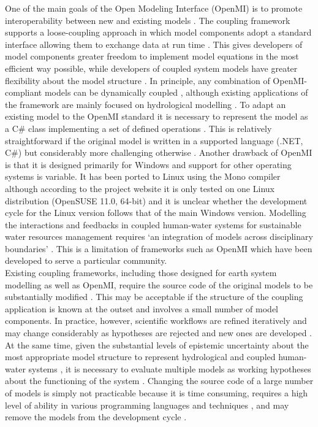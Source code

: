 \documentclass{icldt}\usepackage[]{graphicx}\usepackage[]{color}
\begin{document}
One of the main goals of the Open Modeling Interface (OpenMI) is to promote interoperability between new and existing models \citep{moore2005,gregerson2007,goodall2011}. The coupling framework supports a loose-coupling approach in which model components adopt a standard interface allowing them to exchange data at run time \citep{moore2005}. This gives developers of model components greater freedom to implement model equations in the most efficient way possible, while developers of coupled system models have greater flexibility about the model structure \citep{goodall2011}. In principle, any combination of OpenMI-compliant models can be dynamically coupled \citep{gregerson2007}, although existing applications of the framework are mainly focused on hydrological modelling \citep{}. To adapt an existing model to the OpenMI standard it is necessary to represent the model as a C\# class implementing a set of defined operations \citep{}. This is relatively straightforward if the original model is written in a supported language (.NET, C\#) but considerably more challenging otherwise \citep{}. Another drawback of OpenMI is that it is designed primarily for Windows and support for other operating systems is variable. It has been ported to Linux using the Mono compiler although according to the project website it is only tested on one Linux distribution (OpenSUSE 11.0, 64-bit) and it is unclear whether the development cycle for the Linux version follows that of the main Windows version. Modelling the interactions and feedbacks in coupled human-water systems for sustainable water resources management requires `an integration of models across disciplinary boundaries' \citep{goodall2011}. This is a limitation of frameworks such as OpenMI which have been developed to serve a particular community. \\ 

Existing coupling frameworks, including those designed for earth system modelling as well as OpenMI, require the source code of the original models to be substantially modified \citep{voinov2013}. This may be acceptable if the structure of the coupling application is known at the outset and involves a small number of model components. In practice, however, scientific workflows are refined iteratively and may change considerably as hypotheses are rejected and new ones are developed \citep{mcguire2007,dunn2008,fenicia2008,shao2009}. At the same time, given the substantial levels of epistemic uncertainty about the most appropriate model structure to represent hydrological and coupled human-water systems \citep[e.g.][]{dibaldassarre2015-a}, it is necessary to evaluate multiple models as working hypotheses about the functioning of the system \citep{clark2015}. Changing the source code of a large number of models is simply not practicable because it is time consuming, requires a high level of ability in various programming languages and techniques \citep{bulatewicz2012}, and may remove the models from the development cycle \citep{voinov2013}. \\
\end{document}
